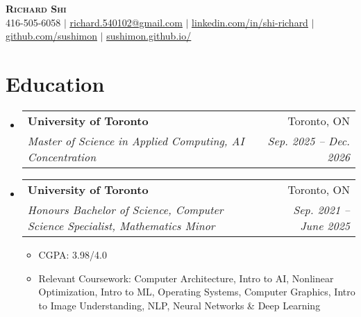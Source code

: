 \documentclass[letterpaper,11pt]{article}
\makeatletter
\newcommand{\resumeItem}[1]{
  \item\small{
    {#1 \vspace{-2pt}}
  }
}
\newcommand{\resumeSubheading}[4]{
  \vspace{-2pt}\item
    \begin{tabular*}{0.97\textwidth}[t]{l@{\extracolsep{\fill}}r}
      \textbf{#1} & #2 \\
      \textit{\small#3} & \textit{\small #4} \\
    \end{tabular*}\vspace{-7pt}
}
\newcommand{\resumeSubHeadingListStart}{\begin{itemize}[leftmargin=0.15in, label={}]}
\newcommand{\resumeSubHeadingListEnd}{\end{itemize}}
\newcommand{\resumeItemListStart}{\begin{itemize}}
\newcommand{\resumeItemListEnd}{\end{itemize}\vspace{-5pt}}
\makeatother
\begin{document}

\begin{center}
    \textbf{\Huge \scshape Richard Shi} \\ \vspace{1pt}
    \small 416-505-6058 $|$ \href{mailto:richard.540102@gmail.com}{\underline{richard.540102@gmail.com}} $|$ 
    \href{https://www.linkedin.com/in/shi-richard/}{\underline{linkedin.com/in/shi-richard}} $|$
    \href{https://github.com/sushimon}{\underline{github.com/sushimon}}
    $|$ \href{https://sushimon.github.io/}{\underline{sushimon.github.io/}}
\end{center}

\section{Education}
  \resumeSubHeadingListStart
    \resumeSubheading
    {University of Toronto}{Toronto, ON}
    {Master of Science in Applied Computing, AI Concentration}{Sep. 2025 -- Dec. 2026}
  
    \resumeSubheading
      {University of Toronto}{Toronto, ON}
      {Honours Bachelor of Science, Computer Science Specialist, Mathematics Minor}{Sep. 2021 -- June 2025}
      \resumeItemListStart
        \resumeItem{CGPA: 3.98/4.0}
        \resumeItem{Relevant Coursework: Computer Architecture, Intro to AI, Nonlinear Optimization, Intro to ML, Operating Systems, Computer Graphics, Intro to Image Understanding, NLP, Neural Networks \& Deep Learning}
      \resumeItemListEnd
  \resumeSubHeadingListEnd
\end{document}
